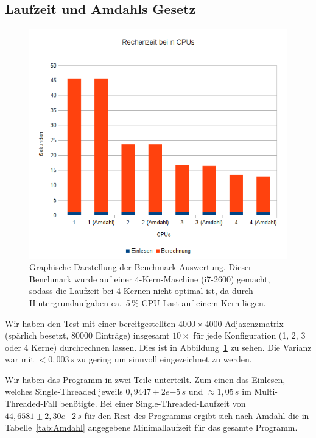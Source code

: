 \documentclass[a4paper]{scrartcl}
\begin{document}
\subsection{Laufzeit und Amdahls Gesetz} \label{test}
\begin{figure}[h!]
 \centering
 \includegraphics[scale=0.75,keepaspectratio=true]{./img/CPUvsAmdahl.png}
 \caption{Graphische Darstellung der Benchmark-Auswertung. Dieser Benchmark wurde auf einer 4-Kern-Maschine (i7-2600) gemacht, sodass die Laufzeit bei 4 Kernen nicht optimal ist, da durch Hintergrundaufgaben ca.\ 5\,\% CPU-Last auf einem Kern liegen.}
 \label{fig:Benchmark}
\end{figure}

Wir haben den Test mit einer bereitgestellten $4000\times 4000$-Adjazenzmatrix (spärlich besetzt, 80000 Einträge) insgesamt $10\times$ für jede Konfiguration (1, 2, 3 oder 4 Kerne) durchrechnen lassen. Dies ist in Abbildung~\ref{fig:Benchmark} zu sehen. Die Varianz war mit $< 0,003\,s$ zu gering um sinnvoll eingezeichnet zu werden. \par
Wir haben das Programm in zwei Teile unterteilt. Zum einen das Einlesen, welches Single-Threaded jeweils $0,9447\pm2e{-5}\,s$ und $\approx 1,05\,s$ im Multi-Threaded-Fall benötigte. Bei einer Single-Threaded-Laufzeit von $44,6581\pm2,30e{-2}\,s$ für den Rest des Programms ergibt sich nach Amdahl die in Tabelle~\ref{tab:Amdahl} angegebene Minimallaufzeit für das gesamte Programm.
\end{document}
